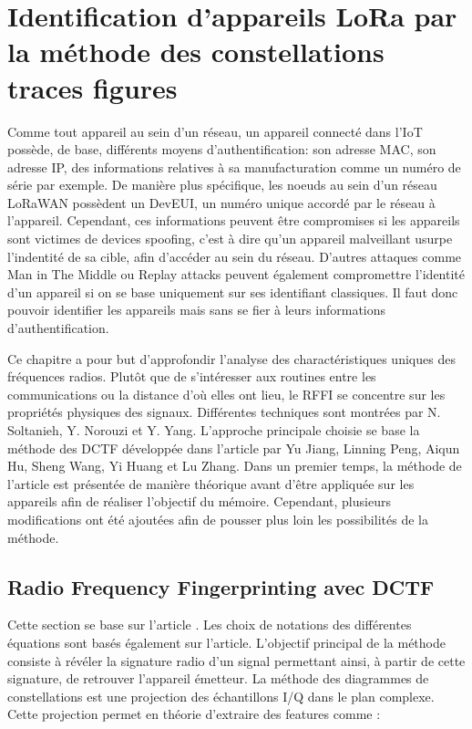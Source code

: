 \renewcommand{\leftmark}{IDENTIFICATION}

\chapter{Identification d'appareils LoRa par la méthode des constellations traces figures}

Comme tout appareil au sein d'un réseau, un appareil connecté dans l'\ac{IoT} possède, de base, différents moyens d'authentification: son adresse \ac{MAC}, son adresse IP, des informations relatives à sa manufacturation comme un numéro de série par exemple. De manière plus spécifique, les noeuds au sein d'un réseau LoRaWAN possèdent un DevEUI, un numéro unique accordé par le réseau à l'appareil. Cependant, ces informations peuvent être compromises si les appareils sont victimes de devices spoofing, c'est à dire qu'un appareil malveillant usurpe l'indentité de sa cible, afin d'accéder au sein du réseau. D'autres attaques comme Man in The Middle ou Replay attacks peuvent également compromettre l'identité d'un appareil si on se base uniquement sur ses identifiant classiques\cite{attack}. Il faut donc pouvoir identifier les appareils mais sans se fier à leurs informations d'authentification.

\vspace{0.1cm}

Ce chapitre a pour but d'approfondir l'analyse des charactéristiques uniques des fréquences radios. Plutôt que de s'intéresser aux routines entre les communications ou la distance d'où elles ont lieu, le \ac{RFFI} se concentre sur les propriétés physiques des signaux. Différentes techniques sont montrées par N. Soltanieh, Y. Norouzi et Y. Yang\cite{rffi1}. L'approche principale choisie se base la méthode des \ac{DCTF} développée dans l'article \cite{loraDCTF} par Yu Jiang, Linning Peng, Aiqun Hu, Sheng Wang, Yi Huang et Lu Zhang. Dans un premier temps, la méthode de l'article est présentée de manière théorique avant d'être appliquée sur les appareils afin de réaliser l'objectif du mémoire. Cependant, plusieurs modifications ont été ajoutées afin de pousser plus loin les possibilités de la méthode.

\section{Radio Frequency Fingerprinting avec DCTF}\label{DCTF}

Cette section se base sur l'article \cite{loraDCTF}. Les choix de notations des différentes équations sont basés également sur l'article. L'objectif principal de la méthode consiste à révéler la signature radio d'un signal permettant ainsi, à partir de cette signature, de retrouver l'appareil émetteur. La méthode des diagrammes de constellations est une projection des échantillons \ac{I/Q} dans le plan complexe. Cette projection permet en théorie d'extraire des features comme :

